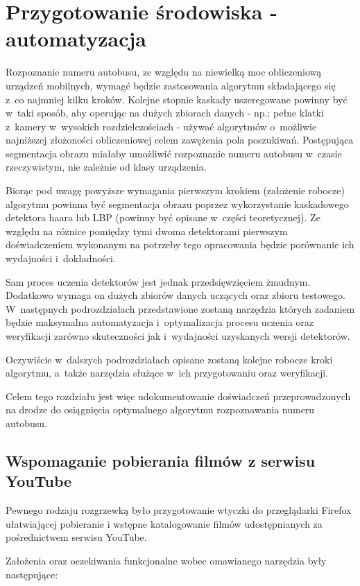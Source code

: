 \chapter{Przygotowanie środowiska - automatyzacja}

Rozpoznanie numeru autobusu, ze względu na niewielką moc obliczeniową
urządzeń mobilnych, wymagć będzie zastosowania algorytmu składającego się
z~co najmniej kilku kroków. Kolejne stopnie kaskady uszeregowane powinny 
być w~taki sposób, aby operując na dużych zbiorach danych - np.: pełne 
klatki z~kamery w~wysokich rozdzielczościach - używać algorytmów o~możliwie
najniższej złożoności obliczeniowej celem zawężenia pola poszukiwań.
Postępująca segmentacja obrazu miałaby umożliwić rozpoznanie
numeru autobusu w~czasie rzeczywistym, nie zależnie od klasy urządzenia.

Biorąc pod uwagę powyższe wymagania pierwszym krokiem (założenie robocze)
algorytmu powinna być segmentacja obrazu poprzez wykorzystanie kaskadowego
detektora haara lub LBP (powinny być opisane w~części teoretycznej).
Ze względu na różnice pomiędzy tymi dwoma detektorami pierwszym
doświadczeniem wykonanym na potrzeby tego opracowania będzie porównanie
ich wydajności i~dokładności. 

Sam proces uczenia detektorów jest jednak przedsięwzięciem żmudnym.
Dodatkowo wymaga on dużych zbiorów danych uczących oraz zbioru testowego.
W~następnych podrozdziałach przedstawione zostaną narzędzia których
zadaniem będzie maksymalna automatyzacja i~optymalizacja procesu uczenia
oraz weryfikacji zarówno skuteczności jak i~wydajności uzyskanych wersji
detektorów.

Oczywiście w~dalszych podrozdziałach opisane zostaną kolejne robocze
kroki algorytmu, a~także narzędzia służące w~ich przygotowaniu oraz 
weryfikacji.

Celem tego rozdziału jest więc udokumentowanie doświadczeń przeprowadzonych
na drodze do osiągnięcia optymalnego algorytmu rozpoznawania numeru
autobusu.

\section{Wspomaganie pobierania filmów z serwisu YouTube}

Pewnego rodzaju rozgrzewką było przygotowanie wtyczki do przeglądarki 
Firefox ułatwiającej pobieranie i wstępne katalogowanie filmów
udostępnianych za pośrednictwem serwisu YouTube.

Założenia oraz oczekiwania funkcjonalne wobec omawianego narzędzia były 
następujące:

